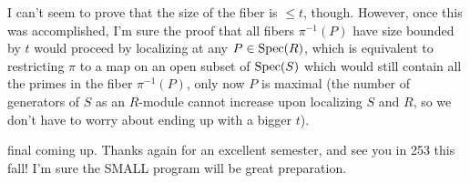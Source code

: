 \documentclass[11pt]{article}
\begin{document}
I can't seem to prove that the size of the fiber is $\leq t$, though. However,
once this was accomplished, I'm sure the proof that all fibers $\pi^{-1}(P)$
have size bounded by $t$ would proceed by localizing at any $P\in\operatorname{Spec}(R)$,
which is equivalent to restricting $\pi$ to a map on an open subset of
$\operatorname{Spec}(S)$ which would still contain all the primes in the fiber $\pi^{-1}(P)$,
only now $P$ is maximal (the number of generators of $S$ as an $R$-module
cannot increase upon localizing $S$ and $R$, so we don't have to worry about
ending up with a bigger $t$).

final coming up. Thanks again for an excellent semester, and see you in 253
this fall! I'm sure the SMALL program will be great preparation.
\end{document}
